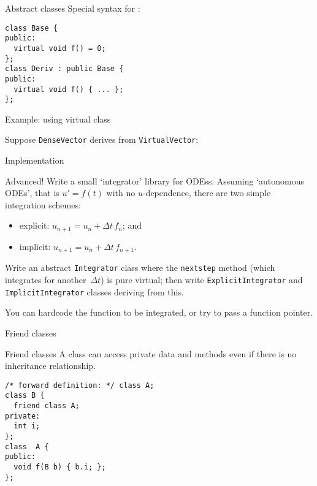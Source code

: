 \begin{block}{Abstract classes}
  \label{sl:abstract-class}
  Special syntax for :
\begin{lstlisting}
class Base {
public:
  virtual void f() = 0;
};
class Deriv : public Base {
public:
  virtual void f() { ... };
};
\end{lstlisting}
\end{block}

\begin{block}{Example: using virtual class}
  \small
  \begin{multicols}{2}
    \vfill\columnbreak
    Suppose \lstinline{DenseVector} derives from \lstinline{VirtualVector}:\\
  \end{multicols}
\end{block}

\begin{block}{Implementation}
  \footnotesize
  \begin{multicols}{2}
  \end{multicols}
\end{block}

\begin{exercise}
  Advanced! Write a small `integrator' library for
  \acp{ODE}s. Assuming `autonomous \acp{ODE}', that is $u'=f(t)$ with
  no $u$-dependence, there are two simple integration schemes:
  \begin{itemize}
  \item explicit: $u_{n+1} = u_n+\Delta t\,f_n$; and
  \item implicit: $u_{n+1} = u_n+\Delta t\,f_{n+1}$.
  \end{itemize}
  Write an abstract \lstinline{Integrator} class where the
  \lstinline{nextstep} method (which integrates for another~$\Delta t$) is pure virtual;
  then write
  \lstinline{ExplicitIntegrator} and \lstinline{ImplicitIntegrator}
  classes deriving from this.


  You can hardcode the function to be integrated, or try to pass a function pointer.
\end{exercise}

 {Friend classes}

\begin{block}{Friend classes}
  \label{sl:obj-friend}
  A  class can access private data and methods
  even if there is no inheritance relationship.
\begin{lstlisting}
/* forward definition: */ class A;
class B {
  friend class A;
private:
  int i;
};
class  A {
public: 
  void f(B b) { b.i; };
};
\end{lstlisting}
\end{block}

